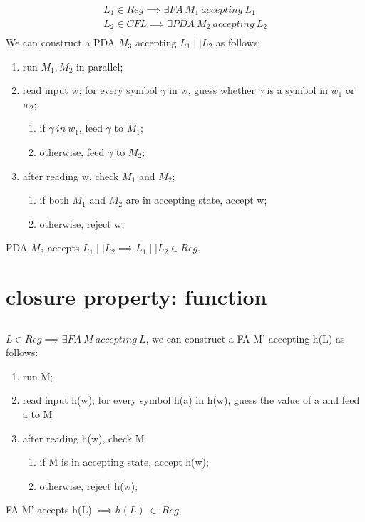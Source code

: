\documentclass{article}
\begin{document}
\begin{align*}
L_1 \in Reg \implies \exists FA \ M_1 \ accepting \ L_1\\
L_2 \in CFL \implies \exists PDA \ M_2 \ accepting \ L_2\\
\end{align*}
We can construct a PDA $ M_3 $ accepting $ L_1 \mid \mid  L_2 $ as follows:
\begin{enumerate}
	\item run $ M_1, M_2 $ in parallel;
	\item read input w; for every symbol $\gamma $ in w, guess whether $\gamma$ is a symbol in $ w_1 $ or $ w_2 $;
	\begin{enumerate}
		\item if $ \gamma \ in \ w_1 $, feed $ \gamma $ to $ M_1 $;
		\item otherwise, feed $ \gamma $ to $ M_2 $;
	\end{enumerate}
	\item after reading w, check $ M_1 $ and $ M_2 $;
	\begin{enumerate}
		\item if both $ M_1  $ and $ M_2 $ are in accepting state, accept w;
		\item otherwise, reject w;	
	\end{enumerate}
\end{enumerate}
PDA $ M_3 $ accepts $L_1 \mid \mid  L_2 \implies L_1 \mid \mid  L_2 \in Reg$.

\section{closure property: function}

\subsection{}

$ L \in Reg \implies \exists FA \ M \ accepting \ L $, we can construct a FA M' accepting h(L) as follows:
\begin{enumerate}
	\item run M;
	\item read input h(w); for every symbol h(a) in h(w), guess the value of a and feed a to M
	\item after reading h(w), check M
	\begin{enumerate}
		\item if M is in accepting state, accept h(w);
		\item otherwise, reject h(w);
	\end{enumerate}
\end{enumerate}
FA M' accepts h(L) $ \implies h(L) \ \in \ Reg $.
\end{document}
